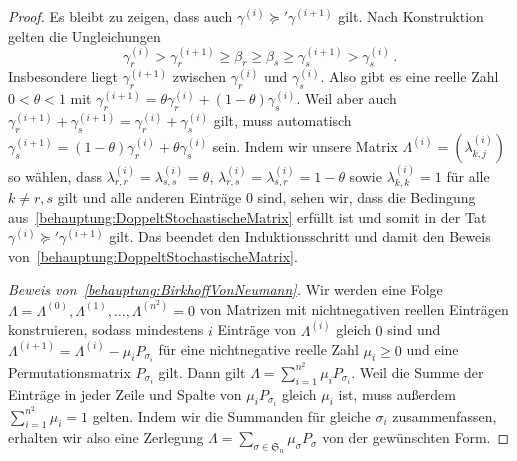 \begin{proof}
	Es bleibt zu zeigen, dass auch $\gamma^{(i)}\succcurlyeq'\gamma^{(i+1)}$ gilt. Nach Konstruktion gelten die Ungleichungen
	\begin{equation*}
		\gamma_r^{(i)}> \gamma_r^{(i+1)}\geqslant \beta_r\geqslant \beta_s\geqslant \gamma_s^{(i+1)}> \gamma_s^{(i)}\,.
	\end{equation*}
	Insbesondere liegt $\gamma_r^{(i+1)}$ zwischen $\gamma_r^{(i)}$ und $\gamma_s^{(i)}$. Also gibt es eine reelle Zahl $0< \theta< 1$ mit $\gamma_r^{(i+1)}=\theta\gamma_r^{(i)}+(1-\theta)\gamma_s^{(i)}$. Weil aber auch $\gamma_r^{(i+1)}+\gamma_s^{(i+1)}=\gamma_r^{(i)}+\gamma_s^{(i)}$ gilt, muss automatisch $\gamma_s^{(i+1)}=(1-\theta)\gamma_r^{(i)}+\theta\gamma_s^{(i)}$ sein. Indem wir unsere Matrix $\Lambda^{(i)}=(\lambda_{k,j}^{(i)})$ so wählen, dass $\lambda_{r,r}^{(i)}=\lambda_{s,s}^{(i)}=\theta$, $\lambda_{r,s}^{(i)}=\lambda_{s,r}^{(i)}=1-\theta$ sowie $\lambda_{k,k}^{(i)}=1$ für alle $k\neq r,s$ gilt und alle anderen Einträge $0$ sind, sehen wir, dass die Bedingung aus~\ref{behauptung:DoppeltStochastischeMatrix} erfüllt ist und somit in der Tat $\gamma^{(i)}\succcurlyeq'\gamma^{(i+1)}$ gilt. Das beendet den Induktionsschritt und damit den Beweis von~\ref{behauptung:DoppeltStochastischeMatrix}.
	
	\emph{Beweis von~\ref{behauptung:BirkhoffVonNeumann}.} Wir werden eine Folge $\Lambda=\Lambda^{(0)},\Lambda^{(1)},\dotsc,\Lambda^{(n^2)}=0$ von Matrizen mit nichtnegativen reellen Einträgen konstruieren, sodass mindestens $i$ Einträge von $\Lambda^{(i)}$ gleich $0$ sind und $\Lambda^{(i+1)}=\Lambda^{(i)}-\mu_i P_{\sigma_i}$ für eine nichtnegative reelle Zahl $\mu_i\geqslant 0$ und eine Permutationsmatrix $P_{\sigma_i}$ gilt. Dann gilt $\Lambda=\sum_{i=1}^{n^2}\mu_iP_{\sigma_i}$. Weil die Summe der Einträge in jeder Zeile und Spalte von $\mu_i P_{\sigma_i}$ gleich $\mu_i$ ist, muss außerdem $\sum_{i=1}^{n^2}\mu_i=1$ gelten. Indem wir die Summanden für gleiche $\sigma_i$ zusammenfassen, erhalten wir also eine Zerlegung $\Lambda=\sum_{\sigma\in\mathfrak S_n}\mu_\sigma P_\sigma$ von der gewünschten Form.
	

\end{proof}
